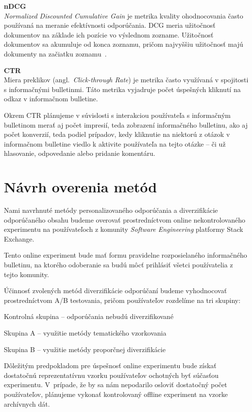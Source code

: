\textbf{nDCG}\\
\textit{Normalized Discounted Cumulative Gain} je metrika kvality ohodnocovania často používaná na meranie efektívnosti
odporúčania. DCG meria užitočnosť dokumentov na základe ich pozície vo výslednom zozname. Užitočnosť dokumentov sa akumuluje
od konca zoznamu, pričom najvyššiu užitočnosť majú dokumenty na začiatku zoznamu~\cite{Jrvelin2002}.

\textbf{CTR}\\
Miera preklikov (angl.~\emph{Click-through Rate}) je metrika často využívaná v spojitosti s informačnými bulletinmi.
Táto metrika vyjadruje počet úspešných kliknutí na odkaz v informačnom bulletine.

Okrem CTR plánujeme v súvislosti s interakciou používateľa s informačným bulletinom merať aj počet impresií,
teda zobrazení informačného bulletinu, ako aj počet konverzií, teda podiel prípadov, kedy kliknutie na niektorú z otázok
v informačnom bulletine viedlo k aktivite používateľa na tejto otázke -- či už hlasovanie, odpovedanie alebo pridanie komentáru.


\section{Návrh overenia metód}

Nami navrhnuté metódy personalizovaného odporúčania a diverzifikácie odporúčaného obsahu budeme overovať prostredníctvom
online nekontrolovaného experimentu na používateľoch z komunity \textit{Software Engineering} platformy Stack Exchange.

Tento online experiment bude mať formu pravidelne rozposielaného informačného bulletinu, na ktorého odoberanie sa budú
môcť prihlásiť všetci používatelia z tejto komunity.

Účinnosť zvolených metód diverzifikácie odporúčaní budeme vyhodnocovať prostredníctvom A/B testovania, pričom používateľov
rozdelíme na tri skupiny:
\begin{my_enumerate}
    \item{Kontrolná skupina -- odporúčania nebudú diverzifikované}
    \item{Skupina A -- využitie metódy tematického vzorkovania}
    \item{Skupina B -- využitie metódy proporčnej diverzifikácie}
\end{my_enumerate}

Dôležitým predpokladom pre úspešnosť online experimentu bude získať dostatočnú reprezentatívnu vzorku používateľov
ochotných byť súčasťou experimentu. V~prípade, že by sa nám nepodarilo osloviť dostatočný počet používateľov, plánujeme
vykonať kontrolovaný offline experiment na vzorke archívnych dát.


